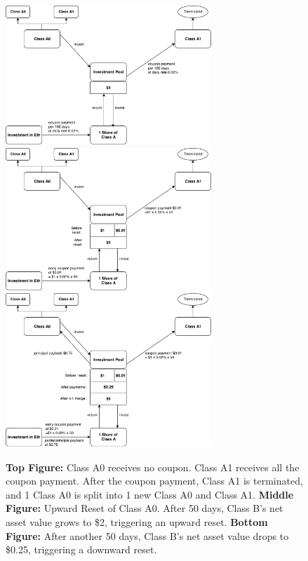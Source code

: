 \documentclass[draft, noinfoline]{ectaart}
\numberwithin{equation}{section}
\theoremstyle{plain}
\begin{document}
\begin{appendices}
\begin{figure}[p]
\centering
	\includegraphics[width=0.69\textwidth]{A0_periodic}
	\vspace{1em}
	\includegraphics[width=0.69\textwidth]{A0_upward}
	\vspace{1em}
	\includegraphics[width=0.69\textwidth]{A0_downward}
	\caption{{\bf Top Figure:} Class A0 receives no coupon.  Class A1 receives all the coupon payment. After the coupon payment, Class A1 is terminated, and 1 Class A0 is split into 1 new Class A0 and Class A1. {\bf Middle Figure:} Upward Reset of Class A0. After 50 days, Class B's net asset value grows to \$2, triggering an upward reset. {\bf Bottom Figure:} After another 50 days, Class B's net asset value drops to \$0.25, triggering a downward reset. }\label{fig:A0}
\end{figure}


\end{appendices}
\end{document}
